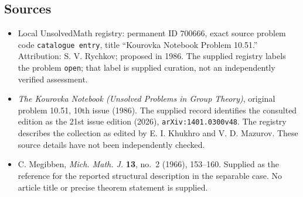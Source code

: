 \documentclass[11pt]{article}
\begin{document}
\subsection{Sources}
\begin{itemize}
\item Local UnsolvedMath registry: permanent ID \(700666\), exact source problem code \texttt{catalogue entry}, title ``Kourovka Notebook Problem 10.51.'' Attribution: S. V. Rychkov; proposed in 1986. The supplied registry labels the problem \texttt{open}; that label is supplied curation, not an independently verified assessment.
\item \emph{The Kourovka Notebook (Unsolved Problems in Group Theory)}, original problem 10.51, 10th issue (1986). The supplied record identifies the consulted edition as the 21st issue edition (2026), \texttt{arXiv:1401.0300v48}. The registry describes the collection as edited by E. I. Khukhro and V. D. Mazurov. These source details have not been independently checked.
\item C. Megibben, \emph{Mich. Math. J.} \textbf{13}, no.~2 (1966), 153--160. Supplied as the reference for the reported structural description in the separable case. No article title or precise theorem statement is supplied.
\end{itemize}
\end{document}
